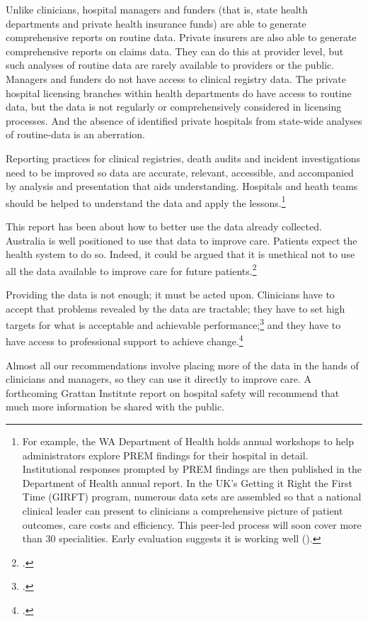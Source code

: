 \documentclass[FrontPage]{grattan}
\begin{document}
Unlike clinicians, hospital managers and funders (that is, state health departments and private health insurance funds) are able to generate comprehensive reports on routine data. Private insurers are also able to generate comprehensive reports on claims data. They can do this at provider level, but such analyses of routine data are rarely available to providers or the public. Managers and funders do not have access to clinical registry data. The private hospital licensing branches within health departments do have access to routine data, but the data is not regularly or comprehensively considered in licensing processes. And the absence of identified private hospitals from state-wide analyses of routine-data is an aberration.

Reporting practices for clinical registries, death audits and incident investigations need to be improved so data are accurate, relevant, accessible, and accompanied by analysis and presentation that aids understanding. Hospitals and heath teams should be helped to understand the data and apply the lessons.\footnote{For example, the WA Department of Health holds annual workshops to help administrators explore PREM findings for their hospital in detail. Institutional responses prompted by PREM findings are then published in the Department of Health annual report. In the UK’s Getting it Right the First Time (GIRFT) program, numerous data sets are assembled so that a national clinical leader can present to clinicians a comprehensive picture of patient outcomes, care costs and efficiency. This peer-led process will soon cover more than 30 specialities. Early evaluation suggests it is working well (\textcite{timmins2017tackling}).}

This report has been about how to better use the data already collected. Australia is well positioned to use that data to improve care. Patients expect the health system to do so. Indeed, it could be argued that it is unethical not to use all the data available to improve care for future patients.\footcite{RN95}

Providing the data is not enough; it must be acted upon. Clinicians have to accept that problems revealed by the data are tractable; they have to set high targets for what is acceptable and achievable performance;\footcite{RN96}
and they have to have access to professional support to achieve change.\footcites{RN38}{RN97}

Almost all our recommendations involve placing more of the data in the hands of clinicians and managers, so they can use it directly to improve care. A forthcoming Grattan Institute report on hospital safety will recommend that much more information be shared with the public. 
\end{document}
